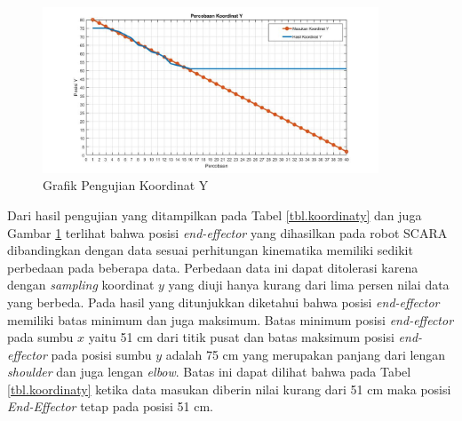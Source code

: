  \begin{figure}[H]
 	\centering
 	\includegraphics[width=10cm]{gambar/pic_koordinaty.jpg}
 	\caption{Grafik Pengujian Koordinat Y}
 	\label{pic.koordinaty}
 \end{figure}


Dari hasil pengujian yang ditampilkan pada Tabel \ref{tbl.koordinaty} dan juga Gambar \ref{pic.koordinaty} terlihat bahwa posisi \textit{end-effector} yang dihasilkan pada robot SCARA dibandingkan dengan data sesuai perhitungan kinematika memiliki sedikit perbedaan pada beberapa data. Perbedaan data ini dapat ditolerasi karena dengan \textit{sampling} koordinat $y$ yang diuji hanya kurang dari lima persen nilai data yang berbeda. Pada hasil yang ditunjukkan diketahui bahwa posisi \textit{end-effector} memiliki batas minimum dan juga maksimum. Batas minimum posisi \textit{end-effector} pada sumbu $x$ yaitu 51 cm dari titik pusat dan batas maksimum posisi \textit{end-effector} pada posisi sumbu $y$ adalah 75 cm yang merupakan panjang dari lengan \textit{shoulder} dan juga lengan \textit{elbow}.  Batas ini dapat dilihat bahwa pada Tabel \ref{tbl.koordinaty} ketika data masukan diberin nilai kurang dari 51 cm maka posisi \textit{End-Effector} tetap pada posisi 51 cm.
